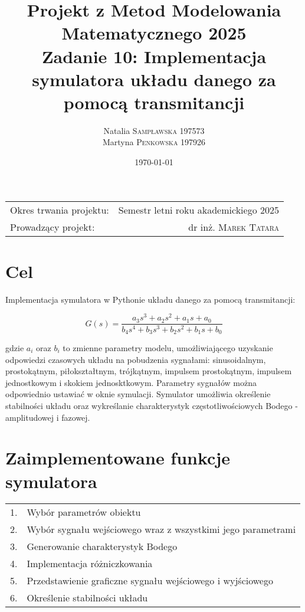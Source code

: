 \documentclass[10pt, a4paper]{article}
\title{
  \textbf{Projekt z Metod Modelowania Matematycznego 2025} \\
  \large Zadanie 10: Implementacja symulatora układu danego za pomocą transmitancji
}
\author{
  Natalia \textsc{Sampławska 197573} \\
  Martyna \textsc{Penkowska 197926}
}
\date{\today}
\begin{document}
\maketitle

\begin{center}
  \begin{tabular}{l r}
    Okres trwania projektu: & Semestr letni roku akademickiego 2025 \\
    Prowadzący projekt: & dr inż. \textsc{Marek Tatara}
  \end{tabular}
\end{center}

\vspace{0.1cm}


\section{Cel}

Implementacja symulatora w Pythonie układu danego za pomocą transmitancji: 

\[
G(s) = \frac{a_3 s^3 + a_2 s^2 + a_1 s + a_0}{b_4 s^4 + b_3 s^3 + b_2 s^2 + b_1 s + b_0}
\]

gdzie \( a_i \) oraz \( b_i \) to zmienne parametry modelu, umożliwiającego uzyskanie odpowiedzi czasowych układu na pobudzenia sygnałami: sinusoidalnym, prostokątnym,
piłokształtnym, trójkątnym, impulsem prostokątnym, impulsem jednostkowym i skokiem jednosktkowym. Parametry sygnałów można odpowiednio ustawiać w oknie symulacji. Symulator 
umożliwia określenie stabilności układu oraz wykreślanie charakterystyk częstotliwościowych Bodego - amplitudowej i fazowej. 


\section{Zaimplementowane funkcje symulatora}


\begin{tabular}{l l}
	1. & Wybór parametrów obiektu\\ 
	2. & Wybór sygnału wejściowego wraz z wszystkimi jego parametrami\\
	3. & Generowanie charakterystyk Bodego\\
	4. & Implementacja różniczkowania\\
	5. & Przedstawienie graficzne sygnału wejściowego i wyjściowego\\
  6. & Określenie stabilności układu \\
\end{tabular}
\end{document}
